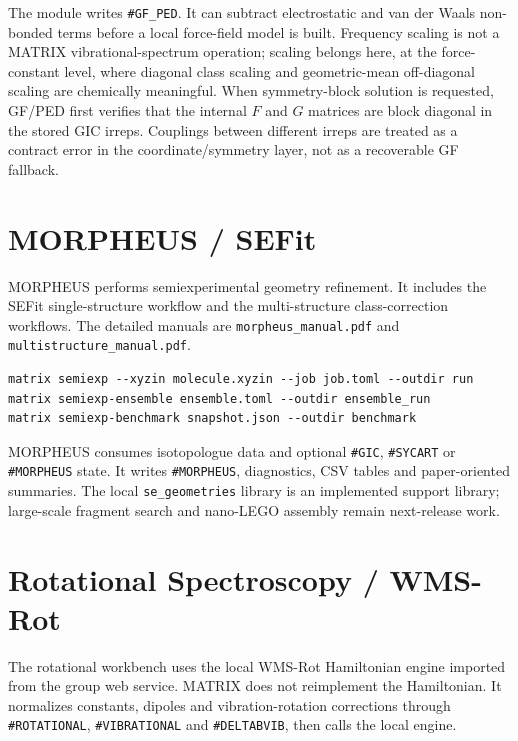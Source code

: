 \documentclass[11pt]{article}
\newcommand{\sectionname}[1]{\texttt{\##1}}
\begin{document}
The module writes \sectionname{GF\_PED}.  It can subtract electrostatic and van
der Waals non-bonded terms before a local force-field model is built.  Frequency
scaling is not a MATRIX vibrational-spectrum operation; scaling belongs here,
at the force-constant level, where diagonal class scaling and geometric-mean
off-diagonal scaling are chemically meaningful.  When symmetry-block solution is
requested, GF/PED first verifies that the internal \(F\) and \(G\) matrices are
block diagonal in the stored GIC irreps.  Couplings between different irreps are
treated as a contract error in the coordinate/symmetry layer, not as a
recoverable GF fallback.

\section{MORPHEUS / SEFit}

MORPHEUS performs semiexperimental geometry refinement.  It includes the SEFit
single-structure workflow and the multi-structure class-correction workflows.
The detailed manuals are \texttt{morpheus\_manual.pdf} and
\texttt{multistructure\_manual.pdf}.

\begin{lstlisting}[style=matrix]
matrix semiexp --xyzin molecule.xyzin --job job.toml --outdir run
matrix semiexp-ensemble ensemble.toml --outdir ensemble_run
matrix semiexp-benchmark snapshot.json --outdir benchmark
\end{lstlisting}

MORPHEUS consumes isotopologue data and optional \sectionname{GIC},
\sectionname{SYCART} or \sectionname{MORPHEUS} state.  It writes
\sectionname{MORPHEUS}, diagnostics, CSV tables and paper-oriented summaries.
The local \texttt{se\_geometries} library is an implemented support library;
large-scale fragment search and nano-LEGO assembly remain next-release work.

\section{Rotational Spectroscopy / WMS-Rot}

The rotational workbench uses the local WMS-Rot Hamiltonian engine imported
from the group web service.  MATRIX does not reimplement the Hamiltonian.  It
normalizes constants, dipoles and vibration-rotation corrections through
\sectionname{ROTATIONAL}, \sectionname{VIBRATIONAL} and
\sectionname{DELTABVIB}, then calls the local engine.
\end{document}
